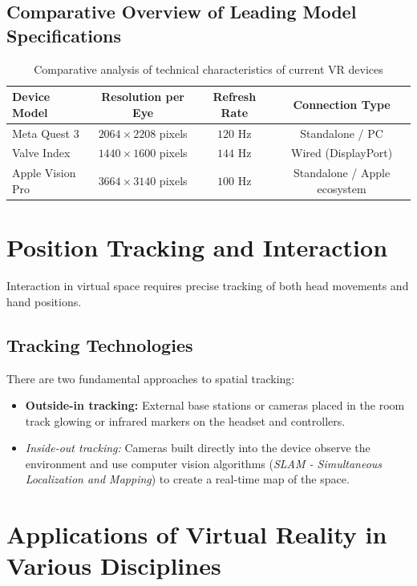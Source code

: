 \documentclass[12pt,a4paper]{article}
\begin{document}
\subsection{Comparative Overview of Leading Model Specifications}

\begin{table}[h]
\centering
\caption{Comparative analysis of technical characteristics of current VR devices}
\vspace{0.2cm}
\begin{tabular}{|l|c|c|c|}
\hline
\textbf{Device Model} & \textbf{Resolution per Eye} & \textbf{Refresh Rate} & \textbf{Connection Type} \\ \hline
Meta Quest 3 & $2064 \times 2208$ pixels & $120 \text{ Hz}$ & Standalone / PC \\ \hline
Valve Index & $1440 \times 1600$ pixels & $144 \text{ Hz}$ & Wired (DisplayPort) \\ \hline
Apple Vision Pro & $3664 \times 3140$ pixels & $100 \text{ Hz}$ & Standalone / Apple ecosystem \\ \hline
\end{tabular}
\end{table}

\section{Position Tracking and Interaction}

Interaction in virtual space requires precise tracking of both head movements and hand positions.

\subsection{Tracking Technologies}
There are two fundamental approaches to spatial tracking:
\begin{itemize}
    \item \textbf{Outside-in tracking:} External base stations or cameras placed in the room track glowing or infrared markers on the headset and controllers.
    \item \textit{Inside-out tracking:} Cameras built directly into the device observe the environment and use computer vision algorithms (\textit{SLAM - Simultaneous Localization and Mapping}) to create a real-time map of the space.
\end{itemize}

\section{Applications of Virtual Reality in Various Disciplines}
\end{document}
